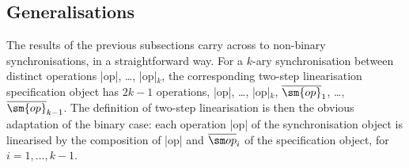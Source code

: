 


\subsection{Generalisations}
\label{ssec:relating-variations}

The results of the previous subsections carry across to non-binary
synchronisations, in a straightforward way.  For a $k$-ary synchronisation
between distinct operations |op|, \ldots, |op|$_k$, the corresponding
two-step linearisation specification object has $2k-1$ operations, |op|,
\ldots, |op|$_k$, $\overline{\sm{op}}_1$, \ldots, $\overline{\sm{op}}_{k-1}$.
The definition of two-step linearisation is then the obvious adaptation of the
binary case: each operation |op| of the synchronisation object is
linearised by the composition of |op| and $\overline{\op}_i$ of the
specification object, for $i = 1, \ldots, k-1$.


